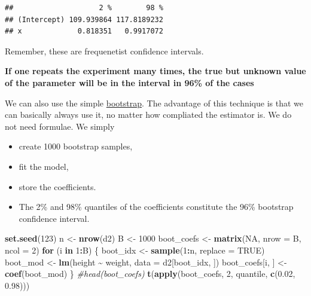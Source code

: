 \documentclass[
]{book}
\newenvironment{Shaded}{\begin{snugshade}}{\end{snugshade}}
\newcommand{\AttributeTok}[1]{\textcolor[rgb]{0.13,0.29,0.53}{#1}}
\newcommand{\CommentTok}[1]{\textcolor[rgb]{0.56,0.35,0.01}{\textit{#1}}}
\newcommand{\ConstantTok}[1]{\textcolor[rgb]{0.56,0.35,0.01}{#1}}
\newcommand{\ControlFlowTok}[1]{\textcolor[rgb]{0.13,0.29,0.53}{\textbf{#1}}}
\newcommand{\DecValTok}[1]{\textcolor[rgb]{0.00,0.00,0.81}{#1}}
\newcommand{\FloatTok}[1]{\textcolor[rgb]{0.00,0.00,0.81}{#1}}
\newcommand{\FunctionTok}[1]{\textcolor[rgb]{0.13,0.29,0.53}{\textbf{#1}}}
\newcommand{\NormalTok}[1]{#1}
\newcommand{\OtherTok}[1]{\textcolor[rgb]{0.56,0.35,0.01}{#1}}
\newcommand{\SpecialCharTok}[1]{\textcolor[rgb]{0.81,0.36,0.00}{\textbf{#1}}}
\providecommand{\tightlist}{%
  \setlength{\itemsep}{0pt}\setlength{\parskip}{0pt}}
\begin{document}
\begin{verbatim}
##                    2 %        98 %
## (Intercept) 109.939864 117.8189232
## x             0.818351   0.9917072
\end{verbatim}

Remember, these are frequenetist confidence intervals.

\textbf{If one repeats the experiment
many times, the true but unknown value of the parameter will
be in the interval in 96\% of the cases}

We can also use the simple \href{https://en.wikipedia.org/wiki/Bootstrapping_(statistics)}{bootstrap}.
The advantage of this technique is that we can basically always use it,
no matter how compliated the estimator is. We do not need formulae.
We simply

\begin{itemize}
\tightlist
\item
  create 1000 bootstrap samples,
\item
  fit the model,
\item
  store the coefficients.
\item
  The 2\% and 98\% quantiles of the coefficients constitute the 96\% bootstrap confidence interval.
\end{itemize}

\begin{Shaded}
\begin{Highlighting}[]
\FunctionTok{set.seed}\NormalTok{(}\DecValTok{123}\NormalTok{)}
\NormalTok{n }\OtherTok{\textless{}{-}} \FunctionTok{nrow}\NormalTok{(d2)}
\NormalTok{B }\OtherTok{\textless{}{-}} \DecValTok{1000}
\NormalTok{boot\_coefs }\OtherTok{\textless{}{-}} \FunctionTok{matrix}\NormalTok{(}\ConstantTok{NA}\NormalTok{, }\AttributeTok{nrow =}\NormalTok{ B, }\AttributeTok{ncol =} \DecValTok{2}\NormalTok{)}
\ControlFlowTok{for}\NormalTok{ (i }\ControlFlowTok{in} \DecValTok{1}\SpecialCharTok{:}\NormalTok{B) \{}
\NormalTok{  boot\_idx }\OtherTok{\textless{}{-}} \FunctionTok{sample}\NormalTok{(}\DecValTok{1}\SpecialCharTok{:}\NormalTok{n, }\AttributeTok{replace =} \ConstantTok{TRUE}\NormalTok{)}
\NormalTok{  boot\_mod }\OtherTok{\textless{}{-}} \FunctionTok{lm}\NormalTok{(height }\SpecialCharTok{\textasciitilde{}}\NormalTok{ weight, }\AttributeTok{data =}\NormalTok{ d2[boot\_idx, ])}
\NormalTok{  boot\_coefs[i, ] }\OtherTok{\textless{}{-}} \FunctionTok{coef}\NormalTok{(boot\_mod)}
\NormalTok{\}}
\CommentTok{\#head(boot\_coefs)}
\FunctionTok{t}\NormalTok{(}\FunctionTok{apply}\NormalTok{(boot\_coefs, }\DecValTok{2}\NormalTok{, quantile, }\FunctionTok{c}\NormalTok{(}\FloatTok{0.02}\NormalTok{, }\FloatTok{0.98}\NormalTok{)))}
\end{Highlighting}
\end{Shaded}
\end{document}
